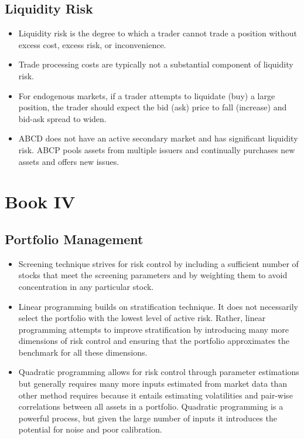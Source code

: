 \subsection{Liquidity Risk}
\begin{itemize}
	\item Liquidity risk is the degree to which a trader cannot trade a position without excess cost, excess risk, or inconvenience.
	\item Trade processing costs are typically not a substantial component of liquidity risk.
	\item For endogenous markets, if a trader attempts to liquidate (buy) a large position, the trader should expect the bid (ask) price to fall (increase) and bid-ask spread to widen.
	\item ABCD does not have an active secondary market and has significant liquidity risk. ABCP pools assets from multiple issuers and continually purchases new assets and offers new issues.
\end{itemize}

\section{Book IV}

\subsection{Portfolio Management}
\begin{itemize}
	\item Screening technique strives for risk control by including a sufficient number of stocks that meet the screening parameters and by weighting them to avoid concentration in any particular stock.
	\item Linear programming builds on stratification technique. It does not necessarily select the portfolio with the lowest level of active risk. Rather, linear programming attempts to improve stratification by introducing many more dimensions of risk control and ensuring that the portfolio approximates the benchmark for all these dimensions.
	\item Quadratic programming allows for risk control through parameter estimations but generally requires many more inputs estimated from market data than other method requires because it entails estimating volatilities and pair-wise correlations between all assets in a portfolio. Quadratic programming is a powerful process, but given the large number of inputs it introduces the potential for noise and poor calibration.
\end{itemize}

